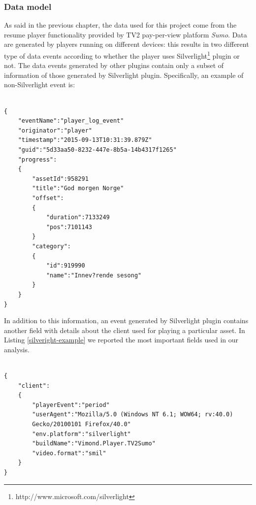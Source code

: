\subsubsection{Data model}
As said in the previous chapter, the data used for this project come from the resume player functionality provided by TV2 pay-per-view platform \textit{Sumo}. Data are generated by players running on different devices: this results in two different type of  data events according to whether the player uses Silverlight\footnote{http://www.microsoft.com/silverlight} plugin or not. The data events generated by other plugins contain only a subset of information of those generated by Silverlight plugin. Specifically, an example of non-Silverlight event is:
\begin{listing}
\begin{verbatim}
               
{     
    "eventName":"player_log_event"
    "originator":"player"
    "timestamp":"2015-09-13T10:31:39.879Z"
    "guid":"5d33aa50-8232-447e-8b5a-14b4317f1265"
    "progress":
    {
    	"assetId":958291
    	"title":"God morgen Norge"
    	"offset":
    	{
    		"duration":7133249
    		"pos":7101143
    	}
    	"category":
    	{
    		"id":919990
    		"name":"Innev?rende sesong"
    	}
    }
}               
\end{verbatim}
\caption{Non-Silverlight event example} 
\label{nosilveright-example}
\end{listing}

\newpage
In addition to this information, an event generated by Silverlight plugin contains another field with details about the client used for playing a particular asset. In Listing \ref{silveright-example} we reported the most important fields used in our analysis.

\begin{listing}
\begin{verbatim}
               
{     
    "client":
    {
    	"playerEvent":"period"
    	"userAgent":"Mozilla/5.0 (Windows NT 6.1; WOW64; rv:40.0) 
    	Gecko/20100101 Firefox/40.0"
    	"env.platform":"silverlight"
    	"buildName":"Vimond.Player.TV2Sumo"
    	"video.format":"smil"
    }
}               
\end{verbatim}
\caption{Silverlight event example} 
\label{silveright-example}
\end{listing}

